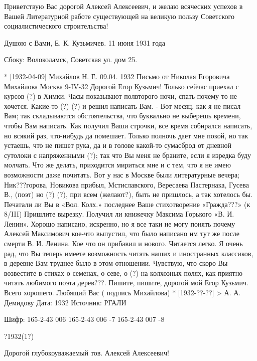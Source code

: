 Приветствую Вас дорогой Алексей Алексеевич, и желаю всяческих успехов в Вашей Литературной работе существующей на великую пользу Советского социалистического строительства!

Душою с Вами, Е. К. Кузьмичев. 11 июня 1931 года

Сбоку: Волоколамск, Советская ул. дом 25.

* [1932-04-09] Михайлов Н. Е.
09.04. 1932
Письмо от Николая Егоровича Михайлова 
Москва 9-IV-32
Дорогой Егор Кузьмич!
Только сейчас приехал с курсов (?) в Химки. Часы показывают полвторого ночи, спать почему то не хочется. Какие-то (?) (?) и решил написать Вам. - 
Вот месяц, как я не писал Вам; так складываются обстоятельства, что буквально не выберешь времени, чтобы Вам написать. Как получил Ваши строчки, все время собирался написать, но всякий раз, что-нибудь да помешает.
Только полночь дает мне покой, но так устаешь, что не пишет рука, да и в голове какой-то сумасброд от дневной сутолоки с напряженными (?); так  что Вы меня не браните, если я изредка буду молчать. 
Что же делать, приходится мириться мне и с тем, что я не имею возможности даже почитать. Вот  у нас в Москве были литературные вечера; Ник???горова, Новикова прибыл, Мстиславского, Вересаева Пастернака, Гусева В., (поэт) но (?) (?), при всем (желают?), быть не пришлось, а так хотелось бы.
Печатали ли Вы в «Вол. Колх.» последнее Ваше стихотворение «Гражда???» (к 8/III) Пришлите вырезку. Получил ли книжечку Максима Горького «В. И. Ленин». Хорошо написано, искренно, но я все таки не могу понять почему Алексей Максимович кое-что  выпустил, что было написано им тут же после смерти В. И. Ленина. Кое что он прибавил и нового. Читается легко. Я очень рад, что Вы теперь имеете возможность читать наших и иностранных классиков, в деревне Вам труднее было в этом отношении.
Чувствую, что скоро Вы возвестите в стихах о семенах, о севе, о (?) на колхозных полях, как приятно читать любимого поэта дерев???. 
Пишите, пишите, дорогой мой Егор Кузьмич.
Всего хорошего.
Любящий Вас ( подпись Михайлова)
* [1932-??-??] > А. А. Демидову 
Дата: 1932
Источник: РГАЛИ


Шифр:   165-2-43 006
        165-2-43 006 -7
        165-2-43 007 -8

?1932(1?)

                                              Дорогой глубокоуважаемый тов. Алексей Алексеевич!

